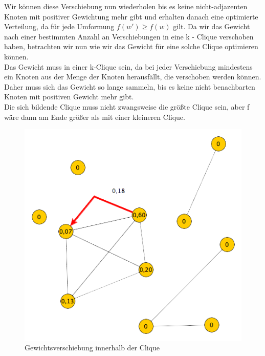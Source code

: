 \documentclass[12pt, a4paper]{article}
\begin{document}
Wir können diese Verschiebung nun wiederholen bis es keine nicht-adjazenten Knoten mit positiver Gewichtung mehr gibt und erhalten danach eine optimierte Verteilung, da für jede Umformung $f(w') \ge f(w)$ gilt. Da wir das Gewicht nach einer bestimmten Anzahl an Verschiebungen in eine k - Clique verschoben haben, betrachten wir nun wie wir das Gewicht für eine solche Clique optimieren können. \\
Das Gewicht muss in einer k-Clique sein, da bei jeder Verschiebung mindestens ein Knoten aus der Menge der Knoten herausfällt, die verschoben werden können. Daher muss sich das Gewicht so lange sammeln, bis es keine nicht benachbarten Knoten mit positiven Gewicht mehr gibt. \\
Die sich bildende Clique muss nicht zwangsweise die größte Clique sein, aber f wäre dann am Ende größer als mit einer kleineren Clique.

\begin{figure}[H] 
		\centering
		\includegraphics[page=1, width=\textwidth]{assets/proof3_before_first_moving_step}
		\caption{Gewichtsverschiebung innerhalb der Clique} 
\end{figure}
\newpage
\end{document}
